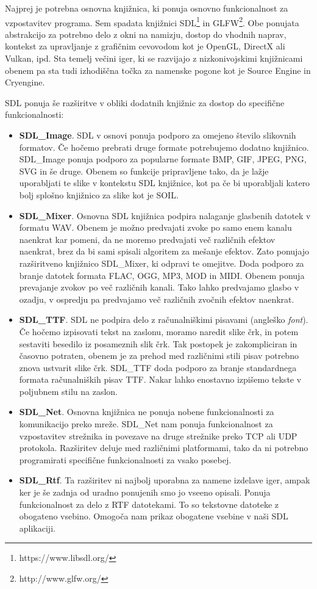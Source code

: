 \documentclass[12pt,a4paper,twoside]{book}
\begin{document}
Najprej je potrebna osnovna knjižnica, ki ponuja osnovno funkcionalnost za vzpostavitev programa. Sem spadata knjižnici SDL\footnote{https://www.libsdl.org/} in GLFW\footnote{http://www.glfw.org/}. Obe ponujata abstrakcijo za potrebno delo z okni na namizju, dostop do vhodnih naprav, kontekst za upravljanje z grafičnim cevovodom kot je OpenGL, DirectX ali Vulkan, ipd. Sta temelj večini iger, ki se razvijajo z nizkonivojskimi knjižnicami obenem pa sta tudi izhodiščna točka za namenske pogone kot je Source Engine\cite{sourceEngineSDL} in Cryengine\cite{cryengineSDL}.

SDL ponuja še razširitve v obliki dodatnih knjižnic za dostop do specifične funkcionalnosti:
\begin{itemize}
	\item \textbf{SDL\_Image}. SDL v osnovi ponuja podporo za omejeno število slikovnih formatov. Če hočemo prebrati druge formate potrebujemo dodatno knjižnico. SDL\_Image ponuja podporo za popularne formate BMP, GIF, JPEG, PNG, SVG in še druge. Obenem so funkcije pripravljene tako, da je lažje uporabljati te slike v kontekstu SDL knjižnice, kot pa če bi uporabljali katero bolj splošno knjižnico za slike kot je SOIL.
	\item \textbf{SDL\_Mixer}. Osnovna SDL knjižnica podpira nalaganje glasbenih datotek v formatu WAV. Obenem je možno predvajati zvoke po samo enem kanalu naenkrat kar pomeni, da ne moremo predvajati več različnih efektov naenkrat, brez da bi sami spisali algoritem za mešanje efektov. Zato ponujajo razširitveno knjižnico SDL\_Mixer, ki odpravi te omejitve. Doda podporo za branje datotek formata FLAC, OGG, MP3, MOD in MIDI. Obenem ponuja prevajanje zvokov po več različnih kanali. Tako lahko predvajamo glasbo v ozadju, v ospredju pa predvajamo več različnih zvočnih efektov naenkrat.
	\item \textbf{SDL\_TTF}. SDL ne podpira delo z računalniškimi pisavami (angleško \textit{font}). Če hočemo izpisovati tekst na zaslonu, moramo naredit slike črk, in potem sestaviti besedilo iz posameznih slik črk. Tak postopek je zakompliciran in časovno potraten, obenem je za prehod med različnimi stili pisav potrebno znova ustvarit slike črk. SDL\_TTF doda podporo za branje standardnega formata računalniških pisav TTF. Nakar lahko enostavno izpišemo tekste v poljubnem stilu na zaslon.
	\item \textbf{SDL\_Net}. Osnovna knjižnica ne ponuja nobene funkcionalnosti za komunikacijo preko mreže. SDL\_Net nam ponuja funkcionalnost za vzpostavitev strežnika in povezave na druge strežnike preko TCP ali UDP protokola. Razširitev deluje med različnimi platformami, tako da ni potrebno programirati specifične funkcionalnosti za vsako posebej.
	\item \textbf{SDL\_Rtf}. Ta razširitev ni najbolj uporabna za namene izdelave iger, ampak ker je še zadnja od uradno ponujenih smo jo vseeno opisali. Ponuja funkcionalnost za delo z RTF datotekami. To so tekstovne datoteke z obogateno vsebino. Omogoča nam prikaz obogatene vsebine v naši SDL aplikaciji.
\end{itemize}
\end{document}
